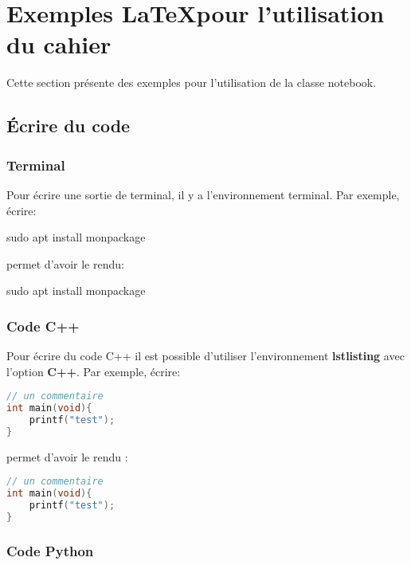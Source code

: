 \section{Exemples \LaTeX pour l'utilisation du cahier}

Cette section présente des exemples pour l'utilisation de la classe notebook. 

\subsection{Écrire du code}

\subsubsection{Terminal}

Pour écrire une sortie de terminal, il y a l'environnement terminal. Par exemple, écrire:

\begin{TeXlstlisting}
\begin{terminal}
sudo apt install monpackage
\end{terminal}
\end{TeXlstlisting}

permet d'avoir le rendu:

\begin{terminal}
sudo apt install monpackage
\end{terminal}

\subsubsection{Code C++}

Pour écrire du code C++ il est possible d'utiliser l'environnement \textbf{lstlisting} avec l'option \textbf{C++}. Par exemple, écrire:

\begin{TeXlstlisting}
\begin{lstlisting}[language=C++]
// un commentaire
int main(void){
    printf("test");
}
\end{lstlisting}
\end{TeXlstlisting}

permet d'avoir le rendu :

\begin{lstlisting}[language=C++]
// un commentaire
int main(void){
    printf("test");
}
\end{lstlisting}

\subsubsection{Code Python}

